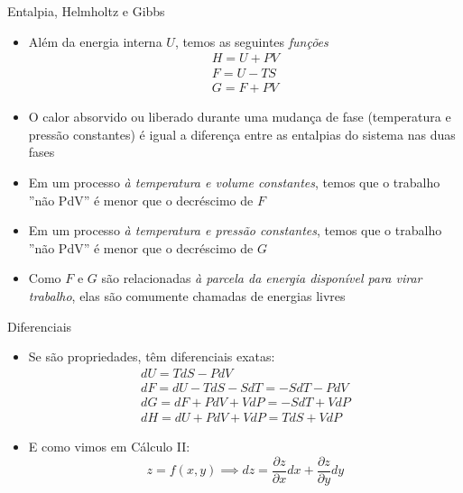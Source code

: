 \documentclass[t,%
brazilian,%
11pt,%
aspectratio=169,%
table%
]{beamer}
\begin{document}
\begin{frame}{Entalpia, Helmholtz e Gibbs}
    \begin{itemize}
        \item Além da energia interna \(U\), temos as seguintes \textit{funções}
            \begin{gather*}
                H=U+PV \\
                F=U-TS \\
                G=F+PV
            \end{gather*}
        \item O calor absorvido ou liberado durante uma mudança de fase (temperatura 
            e pressão constantes) é igual a diferença entre as entalpias do sistema
            nas duas fases
        \item Em um processo \textit{à temperatura e volume constantes}, temos que o 
            trabalho ''não PdV'' é menor que o decréscimo de \(F\)
        \item Em um processo \textit{à temperatura e pressão constantes}, temos que o 
            trabalho ''não PdV'' é menor que o decréscimo de \(G\)
        \item Como \(F\) e \(G\) são relacionadas \textit{à parcela da energia disponível para virar trabalho},
            elas são comumente chamadas de energias livres
    \end{itemize}
\end{frame}

\begin{frame}{Diferenciais}
    \begin{itemize}
        \item Se são propriedades, têm diferenciais exatas:
            \begin{gather*}
                dU = TdS - PdV \\
                dF = dU - TdS - SdT = -SdT - PdV \\
                dG= dF + PdV + VdP = -SdT + VdP \\
                dH = dU + PdV + VdP = TdS + VdP
            \end{gather*}
        \item E como vimos em Cálculo II:
            \[
                z=f(x,y) \implies dz = \frac{\partial z}{\partial x} dx + \frac{\partial z}{\partial y} dy
            \]
    \end{itemize}
\end{frame}
\end{document}

